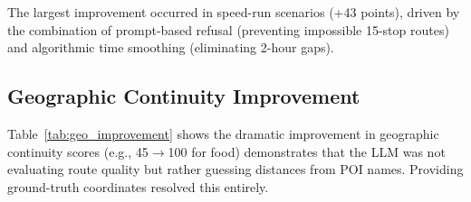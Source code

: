 \begin{table}[!t]
\centering
\caption{Per-scenario scores before and after optimization.}
\label{tab:scenario_changes}
\end{table}

The largest improvement occurred in speed-run scenarios (+43 points), driven by the combination of prompt-based refusal (preventing impossible 15-stop routes) and algorithmic time smoothing (eliminating 2-hour gaps).

\subsection{Geographic Continuity Improvement}

\begin{table}[!t]
\centering
\caption{Geographic continuity scores before and after adding coordinates to evaluation.}
\label{tab:geo_improvement}
\end{table}

Table~\ref{tab:geo_improvement} shows the dramatic improvement in geographic continuity scores (e.g., 45$\rightarrow$100 for food) demonstrates that the LLM was not evaluating route quality but rather guessing distances from POI names. Providing ground-truth coordinates resolved this entirely.

